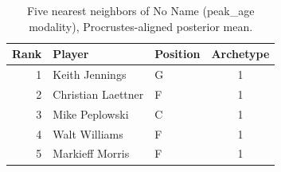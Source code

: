 \begin{table}[htbp]
  \centering\small
  \begin{tabular}{rllc}
    \toprule
    Rank & Player & Position & Archetype \\
    \midrule
    1 & Keith Jennings & G & 1 \\
    2 & Christian Laettner & F & 1 \\
    3 & Mike Peplowski & C & 1 \\
    4 & Walt Williams & F & 1 \\
    5 & Markieff Morris & F & 1 \\
    \bottomrule
  \end{tabular}
  \caption{Five nearest neighbors of No Name (peak_age modality), Procrustes-aligned posterior mean.}
  \label{tab:No_Name_neighbors_peak_age}
\end{table}

